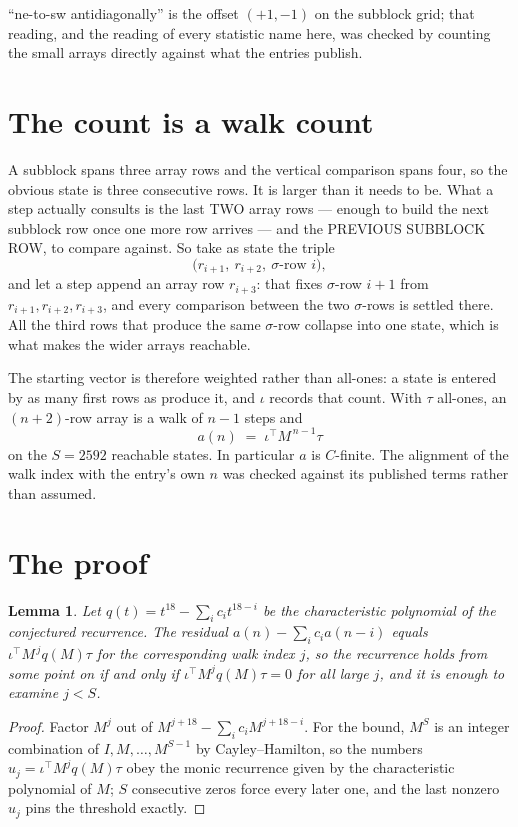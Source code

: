 \documentclass[11pt,a4paper]{article}
\theoremstyle{plain}
\newtheorem{lemma}[theorem]{Lemma}
\theoremstyle{definition}
\begin{document}
``ne-to-sw antidiagonally'' is the offset $(+1,-1)$ on the subblock grid; that reading, and
the reading of every statistic name here, was checked by counting the small arrays directly
against what the entries publish.

\section{The count is a walk count}

A subblock spans three array rows and the vertical comparison spans four, so the obvious state
is three consecutive rows. It is larger than it needs to be. What a step actually consults is
the last TWO array rows --- enough to build the next subblock row once one more row arrives ---
and the PREVIOUS SUBBLOCK ROW, to compare against. So take as state the triple
\[
\bigl(r_{i+1},\ r_{i+2},\ \sigma\text{-row }i\bigr),
\]
and let a step append an array row $r_{i+3}$: that fixes $\sigma$-row $i+1$ from
$r_{i+1},r_{i+2},r_{i+3}$, and every comparison between the two $\sigma$-rows is settled
there. All the third rows that produce the same $\sigma$-row collapse into one state, which is
what makes the wider arrays reachable.

The starting vector is therefore weighted rather than all-ones: a state is entered by as many
first rows as produce it, and $\iota$ records that count. With $\tau$ all-ones, an
$(n+2)$-row array is a walk of $n-1$ steps and
\[
a(n)\;=\;\iota^{\!\top}M^{\,n-1}\tau
\]
on the $S=2592$ reachable states. In particular $a$ is $C$-finite. The alignment of the walk
index with the entry's own $n$ was checked against its published terms rather than assumed.

\section{The proof}

\begin{lemma}\label{lem:crit}
Let $q(t)=t^{18}-\sum_i c_it^{18-i}$ be the characteristic polynomial of the
conjectured recurrence. The residual $a(n)-\sum_ic_ia(n-i)$ equals
$\iota^{\!\top}M^{\,j}q(M)\tau$ for the corresponding walk index $j$, so the recurrence
holds from some point on if and only if $\iota^{\!\top}M^{j}q(M)\tau=0$ for all large $j$,
and it is enough to examine $j<S$.
\end{lemma}

\begin{proof}
Factor $M^{j}$ out of $M^{j+18}-\sum_ic_iM^{j+18-i}$. For the bound, $M^{S}$
is an integer combination of $I,M,\dots,M^{S-1}$ by Cayley--Hamilton, so the numbers
$u_j=\iota^{\!\top}M^{j}q(M)\tau$ obey the monic recurrence given by the characteristic
polynomial of $M$; $S$ consecutive zeros force every later one, and the last nonzero $u_j$
pins the threshold exactly.
\end{proof}
\end{document}
